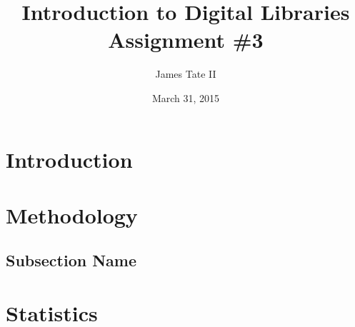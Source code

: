 \documentclass[a4paper,12pt]{article}
\begin{document}
\renewcommand{\thelstlisting}{\thesection-\arabic{lstlisting}}
\renewcommand{\thefigure}{\arabic{section}-\arabic{figure}}
\setlength{\floatsep}{0pt plus 2pt minus 2pt}

\title{Introduction to Digital Libraries Assignment \#3}
\date{March 31, 2015}
\author{James Tate II}
\maketitle

\section{Introduction}

\section{Methodology}

\subsection{Subsection Name}

\section{Statistics}

\end{document}
